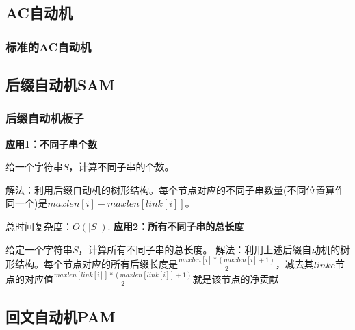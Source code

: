\documentclass{article}
\begin{document}
\subsection{AC自动机}
\subsubsection{标准的AC自动机}


\subsection{后缀自动机SAM}
\subsubsection{后缀自动机板子}
\textbf{应用1：不同子串个数}\par
给一个字符串$S$，计算不同子串的个数。\par
解法：利用后缀自动机的树形结构。每个节点对应的不同子串数量(不同位置算作同一个)是$maxlen[i]-maxlen[link[i]]$。\par
总时间复杂度：$O(|S|)$.
\textbf{应用2：所有不同子串的总长度}\par
给定一个字符串$S$，计算所有不同子串的总长度。
解法：利用上述后缀自动机的树形结构。每个节点对应的所有后缀长度是$\frac{maxlen[i]\ast (maxlen[i]+1)}{2}$，减去其$linke$节点的对应值$\frac{maxlen[link[i]]\ast (maxlen[link[i]]+1)}{2}$就是该节点的净贡献


\subsection{回文自动机PAM}
\end{document}
